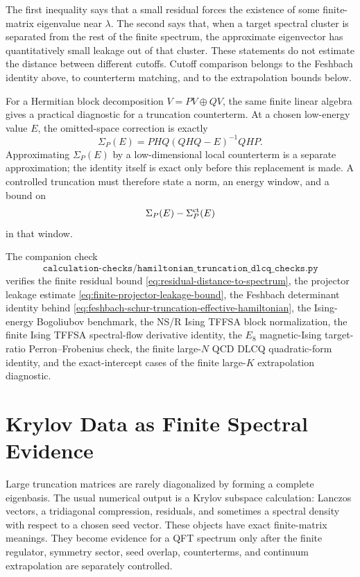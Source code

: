 The first inequality says that a small residual forces the existence of some
finite-matrix eigenvalue near \(\lambda\).  The second says that, when a
target spectral cluster is separated from the rest of the finite spectrum,
the approximate eigenvector has quantitatively small leakage out of that
cluster.  These statements do not estimate the distance between different
cutoffs.  Cutoff comparison belongs to the Feshbach identity above, to
counterterm matching, and to the extrapolation bounds below.

For a Hermitian block decomposition \(V=PV\oplus QV\), the same finite
linear algebra gives a practical diagnostic for a truncation counterterm.
At a chosen low-energy value \(E\), the omitted-space correction is exactly
\begin{equation}
  \Sigma_P(E)=PHQ(QHQ-E)^{-1}QHP .
  \label{eq:finite-schur-self-energy}
\end{equation}
Approximating \(\Sigma_P(E)\) by a low-dimensional local counterterm is a
separate approximation; the identity itself is exact only before this
replacement is made.  A controlled truncation must therefore state a norm,
an energy window, and a bound on
\begin{equation}
  \Sigma_P(E)-\Sigma_P^{\rm ct}(E)
  \label{eq:schur-counterterm-remainder}
\end{equation}
in that window.

The companion check
\[
  \texttt{calculation-checks/hamiltonian\_truncation\_dlcq\_checks.py}
\]
verifies the finite residual bound
\eqref{eq:residual-distance-to-spectrum}, the projector leakage estimate
\eqref{eq:finite-projector-leakage-bound}, the Feshbach determinant identity
behind \eqref{eq:feshbach-schur-truncation-effective-hamiltonian}, the
Ising-energy Bogoliubov benchmark, the NS/R Ising TFFSA block
normalization, the finite Ising TFFSA spectral-flow derivative identity, the
\(E_8\) magnetic-Ising target-ratio Perron--Frobenius check, the finite
large-\(N\) QCD DLCQ quadratic-form identity, and the exact-intercept cases
of the finite large-\(K\) extrapolation diagnostic.

\section{Krylov Data as Finite Spectral Evidence}
\label{sec:krylov-finite-spectral-evidence}

Large truncation matrices are rarely diagonalized by forming a complete
eigenbasis.  The usual numerical output is a Krylov subspace calculation:
Lanczos vectors, a tridiagonal compression, residuals, and sometimes a
spectral density with respect to a chosen seed vector.  These objects have
exact finite-matrix meanings.  They become evidence for a QFT spectrum only
after the finite regulator, symmetry sector, seed overlap, counterterms, and
continuum extrapolation are separately controlled.

